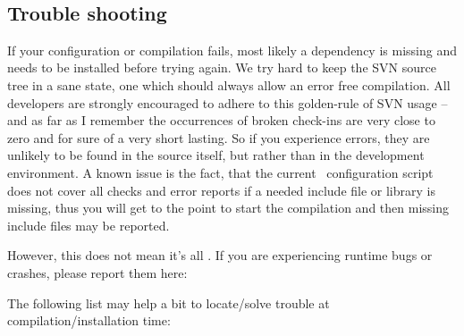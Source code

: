 \\[1mm]

\subsection{Trouble shooting}
\label{sec:Gxsm-install-troubleshooting}

If your configuration or compilation fails, most likely a dependency is missing
and needs to be installed before trying again. We try hard to keep the SVN
source tree in a sane state, one which should always allow an error free
compilation. All developers are strongly encouraged to adhere to this
golden-rule of SVN usage -- and as far as I remember the occurrences of broken
check-ins are very close to zero and for sure of a very short lasting.
So if you experience errors, they are unlikely to be found in the source
itself, but rather than in the development environment. A known
issue is the fact, that the current \Gxsm\ configuration script does not cover
all checks and error reports if a needed include file or library is missing,
thus you will get to the point to start the compilation and then missing
include files may be reported.

However, this does not mean it's all . If you are
experiencing runtime bugs or crashes, please report them here:\\

The following list may help a bit to locate/solve trouble at
compilation/installation time:

